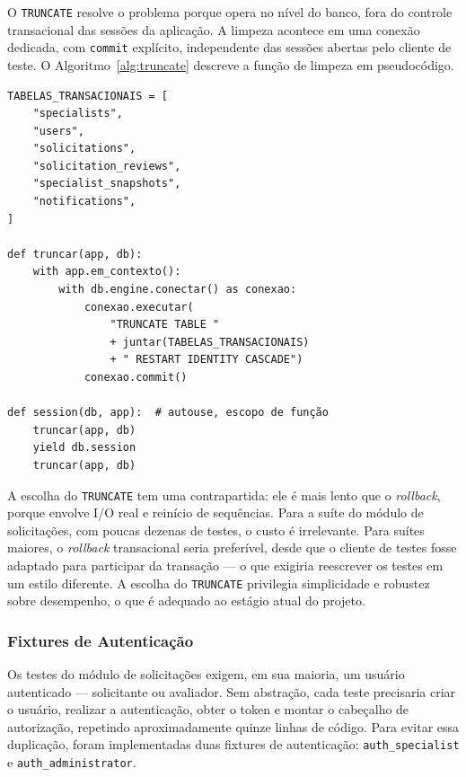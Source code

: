O \texttt{TRUNCATE} resolve o problema porque opera no nível do banco, fora do controle
transacional das sessões da aplicação. A limpeza acontece em uma conexão dedicada, com
\texttt{commit} explícito, independente das sessões abertas pelo cliente de teste. O
Algoritmo~\ref{alg:truncate} descreve a função de limpeza em pseudocódigo.

\begin{algorithm}[htbp]
\caption{Limpeza de tabelas transacionais entre testes (pseudocódigo).}
\label{alg:truncate}
\begin{verbatim}
TABELAS_TRANSACIONAIS = [
    "specialists",
    "users",
    "solicitations",
    "solicitation_reviews",
    "specialist_snapshots",
    "notifications",
]

def truncar(app, db):
    with app.em_contexto():
        with db.engine.conectar() as conexao:
            conexao.executar(
                "TRUNCATE TABLE "
                + juntar(TABELAS_TRANSACIONAIS)
                + " RESTART IDENTITY CASCADE")
            conexao.commit()

def session(db, app):  # autouse, escopo de função
    truncar(app, db)
    yield db.session
    truncar(app, db)
\end{verbatim}
\end{algorithm}

A escolha do \texttt{TRUNCATE} tem uma contrapartida: ele é mais lento
que o \textit{rollback}, porque envolve I/O real e reinício de sequências.
Para a suíte do módulo de solicitações, com poucas dezenas de testes, o
custo é irrelevante. Para suítes maiores, o \textit{rollback} transacional
seria preferível, desde que o cliente de testes fosse adaptado para
participar da transação — o que exigiria reescrever os testes em um
estilo diferente. A escolha do \texttt{TRUNCATE} privilegia simplicidade
e robustez sobre desempenho, o que é adequado ao estágio atual do projeto.

\subsubsection{Fixtures de Autenticação}

Os testes do módulo de solicitações exigem, em sua maioria, um usuário
autenticado — solicitante ou avaliador. Sem abstração, cada teste precisaria
criar o usuário, realizar a autenticação, obter o token e montar o cabeçalho
de autorização, repetindo aproximadamente quinze linhas de código.
Para evitar essa duplicação, foram implementadas duas fixtures de autenticação:
\texttt{auth\_specialist} e \texttt{auth\_administrator}.

